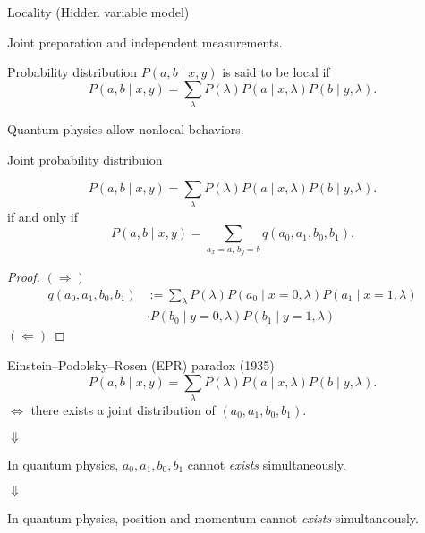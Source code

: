\documentclass{beamer}
\newcommand\emm[1]{\textcolor{redorange}{{#1}}}
\newcommand\numc[1]{\textcolor{citation}{{\bf #1}}}
\begin{document}
\begin{frame}{Locality (Hidden variable model)}
\begin{center}
Joint preparation and independent measurements.
\end{center}
Probability distribution $P(a,b\mid x,y)$ is said to be \emm{local} if
\begin{equation*}
P(a, b\mid x,y) = \sum_{\lambda} P(\lambda) P(a\mid x, \lambda) P(b\mid y,\lambda).
\end{equation*}
\vspace{2em}
\begin{center}
Quantum physics allow \emm{nonlocal} behaviors.
\end{center}
\end{frame}

\begin{frame}{Joint probability distribuion}
\small
\begin{lemma}
\begin{equation*}
P(a, b\mid x,y) = \sum_{\lambda} P(\lambda) P(a\mid x, \lambda) P(b\mid y,\lambda).
\end{equation*}
if and only if
\begin{equation*}
P(a, b\mid x,y) = \sum_{a_x = a,\, b_y = b} q(a_0, a_1, b_0, b_1).
\end{equation*}
\end{lemma}
\begin{proof}
$(\Rightarrow)$
\begin{align*}
q(a_0,a_1,b_0,b_1) &:= \sum_{\lambda}P(\lambda) P(a_0\mid x=0, \lambda) P(a_1\mid x=1, \lambda)\\
&\cdot P(b_0\mid y=0, \lambda) P(b_1\mid y=1, \lambda)
\end{align*}
$(\Leftarrow)$
\end{proof}
\end{frame}

\begin{frame}{Einstein--Podolsky--Rosen (EPR) paradox (1935)}
\begin{equation*}
P(a, b\mid x,y) = \sum_{\lambda} P(\lambda) P(a\mid x, \lambda) P(b\mid y,\lambda).
\end{equation*}
$\iff$
there exists a joint distribution of $(a_0,a_1,b_0,b_1)$.

\begin{center}
\Large
$\Downarrow$

\vspace{1.0em}
\normalsize
In quantum physics,
$a_0,a_1,b_0,b_1$ \emm{cannot \textit{exists}} simultaneously.

\vspace{1.0em}
\Large
$\Downarrow$

\vspace{1.0em}
\normalsize
In quantum physics,
position and momentum \emm{cannot \textit{exists}} simultaneously.
\end{center}

\end{frame}
\end{document}
